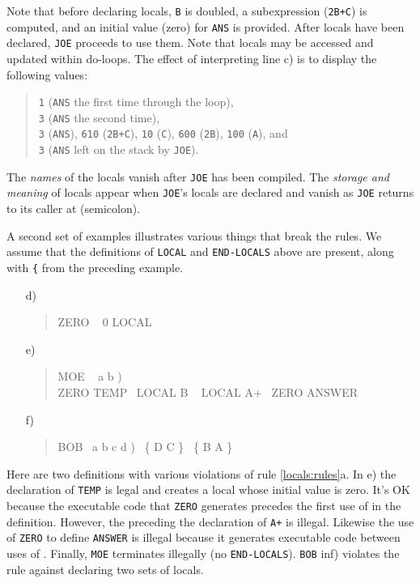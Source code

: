 \begin{intro}
Note that before declaring locals, \texttt{B} is doubled, a
subexpression (\texttt{2B+C}) is computed, and an initial value (zero)
for \texttt{ANS} is provided. After locals have been declared,
\texttt{JOE} proceeds to use them. Note that locals may be accessed and
updated within do-loops. The effect of interpreting line c) is to display
the following values:

\begin{quote}
	\texttt{1} (\texttt{ANS} the first time through the loop),\\
	\texttt{3} (\texttt{ANS} the second time), \\
	\texttt{3} (\texttt{ANS}),
		\texttt{610} (\texttt{2B+C}),
		\texttt{10}  (\texttt{C}),
		\texttt{600} (\texttt{2B}),
		\texttt{100} (\texttt{A}), and \\
	\texttt{3} (\texttt{ANS} left on the stack by \texttt{JOE}).
\end{quote}

The \emph{names} of the locals vanish after \texttt{JOE} has been
compiled. The \emph{storage and meaning} of locals appear when
\texttt{JOE}'s locals are declared and vanish as \texttt{JOE} returns
to its caller at \word{;} (semicolon).

A second set of examples illustrates various things that break the
rules. We assume that the definitions of \texttt{LOCAL} and
\texttt{END-LOCALS} above are present, along with \texttt{\{} from
the preceding example.

\begin{enumerate}
\item[d)] \begin{quote}\ttfamily
	\word{:} ZERO ~ 0    LOCAL
	\word{;} 
	\end{quote}

\item[e)] \begin{quote}\ttfamily
	\word{:} MOE ~ a b ) \\
	\tab ZERO TEMP ~LOCAL B ~ LOCAL A+ ~ZERO ANSWER \word{;}
	\end{quote}

\item[f)] \begin{quote}\ttfamily
	\word{:} BOB~  a b c d ) ~\{ D C \} ~\{ B A \} \word{;}
	\end{quote}
\end{enumerate}

Here are two definitions with various violations of rule
\ref{locals:rules}a. In e) the declaration of \texttt{TEMP} is legal
and creates a local whose initial value is zero. It's OK because the
executable code that \texttt{ZERO} generates precedes the first use of
 in the definition. However, the 
preceding the declaration of \texttt{A+} is illegal. Likewise the use
of \texttt{ZERO} to define \texttt{ANSWER} is illegal because it
generates executable code between uses of .
Finally, \texttt{MOE} terminates illegally (no \texttt{END-LOCALS}).
\texttt{BOB} inf) violates the rule against declaring two sets of
locals.


\end{intro}
